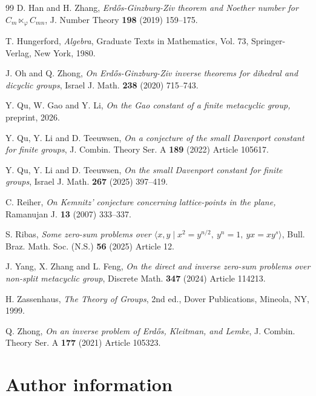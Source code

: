 \documentclass[a4paper, 12pt]{article}
\theoremstyle{definition}
\begin{document}
\begin{thebibliography}{99}
D. Han and H. Zhang,
\emph{Erd\H{o}s-Ginzburg-Ziv theorem and Noether number for
$C_m\ltimes_{\varphi} C_{mn}$},
J. Number Theory \textbf{198} (2019) 159--175.



T. Hungerford,
\emph{Algebra},
Graduate Texts in Mathematics, Vol. 73,
Springer-Verlag, New York, 1980.


J. Oh and Q. Zhong,
\emph{On Erd\H{o}s-Ginzburg-Ziv inverse theorems for dihedral
and dicyclic groups},
Israel J. Math. \textbf{238} (2020) 715--743.


 Y. Qu, W. Gao and Y. Li, \emph{On the Gao constant of a finite metacyclic group,} preprint, 2026.


Y. Qu, Y. Li and D. Teeuwsen,
\emph{On a conjecture of the small Davenport constant for finite groups},
J. Combin. Theory Ser. A \textbf{189} (2022) Article 105617.


 Y. Qu, Y. Li and D. Teeuwsen, \emph{On the small Davenport constant for finite groups}, Israel J. Math. \textbf{267} (2025) 397--419.

C. Reiher,
\emph{On Kemnitz' conjecture concerning lattice-points in the plane,}
Ramanujan J. \textbf{13} (2007) 333--337.

S. Ribas,
\emph{Some zero-sum problems over
$\langle x,y\mid x^2=y^{n/2},\ y^n=1,\ yx=xy^s\rangle$},
Bull. Braz. Math. Soc. (N.S.) \textbf{56} (2025)  Article 12.



J. Yang, X. Zhang and L. Feng,
\emph{On the direct and inverse zero-sum problems over non-split
metacyclic group},
Discrete Math. \textbf{347} (2024)  Article 114213.

H. Zassenhaus,
\emph{The Theory of Groups},
2nd ed., Dover Publications, Mineola, NY, 1999.

Q. Zhong,
\emph{On an inverse problem of Erd\H{o}s, Kleitman, and Lemke},
J. Combin. Theory Ser. A \textbf{177} (2021)  Article 105323.





\end{thebibliography}

\section*{Author information}
\end{document}
